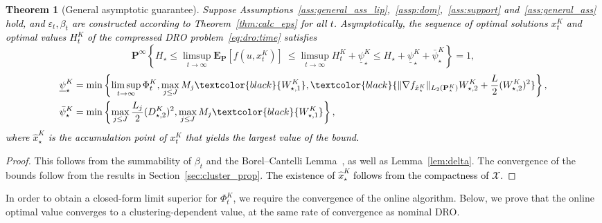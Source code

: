 \documentclass[12pt]{article}
\newcommand{\prob}{{\mathbf P}}
\newcommand{\unc}{u}
\newcommand{\epsnom}{\varepsilon}
\newcommand{\ld}{W}
\newtheorem{theorem}{Theorem}[section]  %
\newcommand{\RC}[1]{\textcolor{black}{#1}}
\newcommand{\RC}[1]{\textcolor{blue}{#1}}
\begin{document}
\begin{theorem}[General asymptotic guarantee]
\label{thm:asym}
\RC{Suppose Assumptions~\ref{ass:general_ass_lip},~\ref{assp:dom},~\ref{ass:support} and~\ref{ass:general_ass} hold, and $\epsnom_t,\beta_t$ are constructed according to Theorem~\ref{thm:calc_eps} for all $t$. 
Asymptotically, 
\ifpreprint the sequence of optimal solutions $x^K_t$ and optimal values $H^K_t$ of the compressed \gls{DRO} problem~\eqref{eq:dro:time} satisfies\fi}
\ifsiam \vspace{-0.6em} \fi
\begin{equation*} 
\mathbf{P}^\infty\left\{ H_\star \leq  \limsup_{t \rightarrow \infty }\mathbf{E}_{\mathbf{P}}[f(\unc, x^K_{t})]\ \leq \limsup_{t \rightarrow \infty } H^K_t + \underline{\psi}_\star^K \leq H_\star + \underline{\psi}_\star^K + \bar{\psi}_\star^K \right\} = 1,
\end{equation*}
\ifsiam 
\vspace{-2em}
\fi
\begin{equation*}
    \begin{aligned}
        \underline{\psi}_\star^K &= \min \left\{
   \limsup_{t \rightarrow \infty } {\Phi^K_t},
        \max_{j\leq J}M_j\RC{\ld^K_{\star,1}}, \RC{\|\nabla f_{\hat{x}^K_\star}\|_{L_2(\prob^K_\star)}\ld^K_{\star,2} + \frac{L}{2}(\ld^K_{\star,2})^2}\right\},\\
        \bar{\psi}_\star^K &=
\min \left\{ {\max_{j \leq J}\frac{L_j}{2}}(D^K_{\star,2})^2,  \max_{j\leq J}M_j\RC{\ld^K_{\star,1}}\right\},
    \end{aligned}
\end{equation*}
\RC{where $\hat{x}^K_\star$ is the accumulation point of $x^K_t$ that yields the largest value of the bound.}
\end{theorem}
\begin{proof}
    This follows from the summability of $\beta_t$ and the Borel–Cantelli Lemma~\cite[Theorem 2.18]{borel}, as well as Lemma~\ref{lem:delta}. 
    The convergence of the bounds follow from the results in Section~\ref{sec:cluster_prop}. \RC{The existence of $\hat{x}^K_\star$ follows from the compactness of $\mathcal{X}$.}
\end{proof}
In order to obtain a closed-form limit superior for ${\Phi^K_t}$, we require the convergence of the online algorithm. 
Below, we prove that the online optimal value converges to a clustering-dependent value, at the same rate of convergence as nominal \gls{DRO}. 
\end{document}
